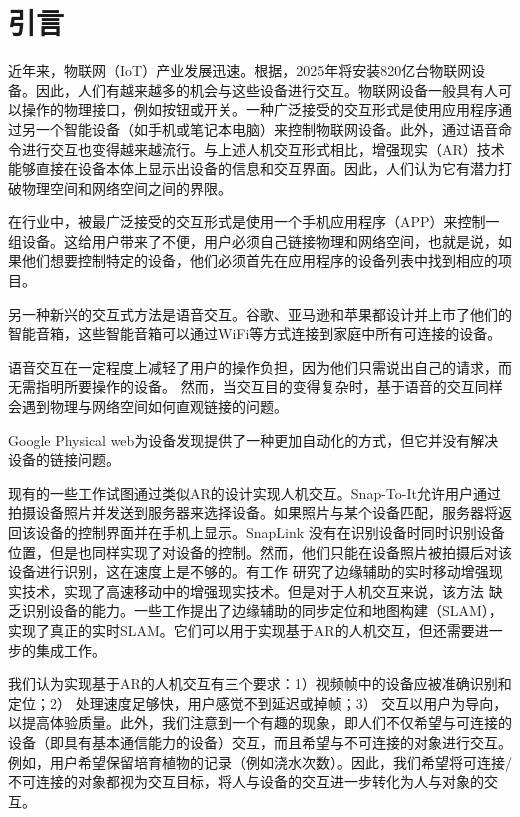 \def\fr{30}
\def\edg{边缘服务端}
\def\fr{10}
\def\acc{72.7\%}
\def\idenT{93毫秒}
\def\uiT{20秒}

\chapter{引言}\label{chap:introduction}

近年来，物联网（IoT）产业发展迅速。根据\cite{macgillivray2019worldwide}，2025年将安装820亿台物联网设备。因此，人们有越来越多的机会与这些设备进行交互。物联网设备一般具有人可以操作的物理接口，例如按钮或开关。一种广泛接受的交互形式是使用应用程序通过另一个智能设备（如手机或笔记本电脑）来控制物联网设备\cite{homeass,xiaomi}。此外，通过语音命令进行交互也变得越来越流行\cite{li2019iot,porcheron2018voice}。与上述人机交互形式相比，增强现实（AR）技术能够直接在设备本体上显示出设备的信息和交互界面。因此，人们认为它有潜力打破物理空间和网络空间之间的界限。

在行业中，被最广泛接受的交互形式是使用一个手机应用程序（APP）来控制一组设备。这给用户带来了不便，用户必须自己链接物理和网络空间，也就是说，如果他们想要控制特定的设备，他们必须首先在应用程序的设备列表中找到相应的项目。

另一种新兴的交互式方法是语音交互。谷歌、亚马逊和苹果都设计并上市了他们的智能音箱，这些智能音箱可以通过WiFi等方式连接到家庭中所有可连接的设备。

语音交互在一定程度上减轻了用户的操作负担，因为他们只需说出自己的请求，而无需指明所要操作的设备。
然而，当交互目的变得复杂时，基于语音的交互同样会遇到物理与网络空间如何直观链接的问题。

Google Physical web\cite{jenson2014physical}为设备发现提供了一种更加自动化的方式，但它并没有解决设备的链接问题。

现有的一些工作试图通过类似AR的设计实现人机交互\cite{de2016snap,chen2018snaplink}。Snap-To-It\cite{de2016snap}允许用户通过拍摄设备照片并发送到服务器来选择设备。如果照片与某个设备匹配，服务器将返回该设备的控制界面并在手机上显示。SnapLink\cite{chen2018snaplink} 没有在识别设备时同时识别设备位置，但是也同样实现了对设备的控制。然而，他们只能在设备照片被拍摄后对该设备进行识别，这在速度上是不够的。有工作\cite{liu2019edge} 研究了边缘辅助的实时移动增强现实技术，实现了高速移动中的增强现实技术。但是对于人机交互来说，该方法\cite{liu2019edge} 缺乏识别设备的能力。一些工作\cite{ben2020edge,xu2020edge,liu2021edgesharing}提出了边缘辅助的同步定位和地图构建（SLAM），实现了真正的实时SLAM。它们可以用于实现基于AR的人机交互，但还需要进一步的集成工作。

我们认为实现基于AR的人机交互有三个要求：1）视频帧中的设备应被准确识别和定位；2） 处理速度足够快，用户感觉不到延迟或掉帧；3） 交互以用户为导向，以提高体验质量。此外，我们注意到一个有趣的现象，即人们不仅希望与可连接的设备（即具有基本通信能力的设备）交互，而且希望与不可连接的对象进行交互。例如，用户希望保留培育植物的记录（例如浇水次数）。因此，我们希望将可连接/不可连接的对象都视为交互目标，将人与设备的交互进一步转化为人与对象的交互。

